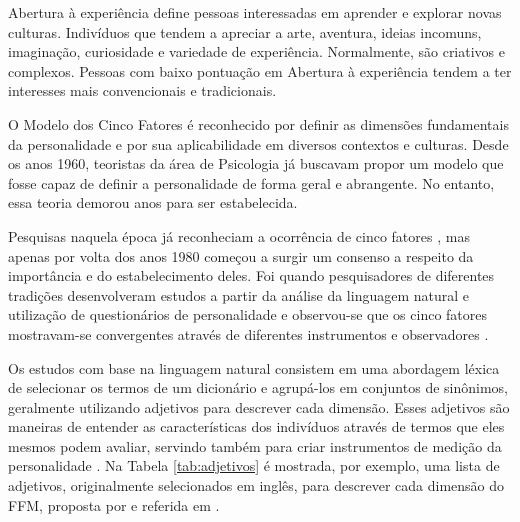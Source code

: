 Abertura à experiência define pessoas interessadas em aprender e explorar novas culturas. Indivíduos que tendem a apreciar a arte, aventura, ideias incomuns, imaginação, curiosidade e variedade de experiência. Normalmente, são criativos e complexos. Pessoas com baixo pontuação em Abertura à experiência tendem a ter interesses mais convencionais e tradicionais.

O Modelo dos Cinco Fatores é reconhecido por definir as dimensões fundamentais da personalidade e por sua aplicabilidade em diversos contextos e culturas. Desde os anos 1960, teoristas da área de Psicologia já buscavam propor um modelo que fosse capaz de definir a personalidade de forma geral e abrangente. No entanto, essa teoria demorou anos para ser estabelecida.

Pesquisas naquela época já reconheciam a ocorrência de cinco fatores \cite{tupes:61} \cite{norman:63}, mas apenas por volta dos anos 1980 começou a surgir um consenso a respeito da importância e do estabelecimento deles. Foi quando pesquisadores de diferentes tradições desenvolveram estudos a partir da análise da linguagem natural e utilização de questionários de personalidade e observou-se que os cinco fatores mostravam-se convergentes através de diferentes instrumentos e observadores \cite{mccrae:92}.

Os estudos com base na linguagem natural consistem em uma abordagem léxica de selecionar os termos de um dicionário %
e agrupá-los em conjuntos de sinônimos, geralmente utilizando adjetivos para descrever cada dimensão. Esses adjetivos são maneiras de entender as características dos indivíduos através de termos que eles mesmos podem avaliar, servindo também para criar instrumentos de medição da personalidade \cite{goldberg:83} \cite{mccrae:85}. Na Tabela \ref{tab:adjetivos} é mostrada, por exemplo, uma lista de adjetivos, originalmente selecionados em inglês, para descrever cada dimensão do FFM, proposta por \cite{john:89} e referida em \cite{mccrae:92}.


